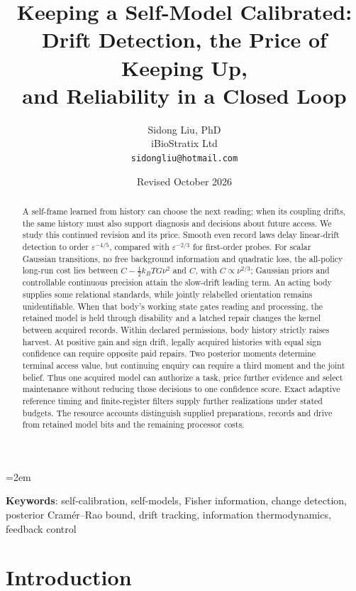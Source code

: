 \documentclass[12pt]{article}
\title{Keeping a Self-Model Calibrated:\\
Drift Detection, the Price of Keeping Up,\\
and Reliability in a Closed Loop}
\author{Sidong Liu, PhD \\
\small iBioStratix Ltd \\
\small \texttt{sidongliu@hotmail.com}}
\date{Revised October 2026}
\theoremstyle{definition}
\begin{document}
\emergencystretch=2em
\raggedbottom
\maketitle

\begin{abstract}
A self-frame learned from history can choose the next reading; when
its coupling drifts, the same history must also support diagnosis
and decisions about future access. We study this continued
revision and its price. Smooth even record laws delay linear-drift
detection to order $\varepsilon^{-4/5}$, compared with
$\varepsilon^{-2/3}$ for first-order probes.
For scalar Gaussian transitions, no free background information and
quadratic loss, the all-policy long-run cost lies between
$C-\tfrac12k_BTG\nu^2$ and $C$, with $C\propto\nu^{2/3}$;
Gaussian priors and controllable continuous precision attain the
slow-drift leading term. An acting body supplies some relational
standards, while jointly relabelled orientation remains unidentifiable.
When that body's working state gates reading and processing, the
retained model is held through disability and a latched repair
changes the kernel between acquired records.
Within declared permissions, body history strictly raises harvest.
At positive gain and sign drift, legally acquired histories with equal
sign confidence can require opposite paid repairs.
Two posterior moments determine terminal access value, but continuing
enquiry can require a third moment and the joint belief.
Thus one acquired model can authorize a task, price further evidence
and select maintenance without reducing those decisions to one
confidence score.
Exact adaptive reference timing and finite-register filters supply
further realizations under stated budgets.
The resource accounts distinguish supplied preparations, records and
drive from retained model bits and the remaining processor costs.
\end{abstract}

\medskip
\noindent\textbf{Keywords}: self-calibration, self-models, Fisher information, change detection, posterior Cram\'er--Rao bound, drift tracking, information thermodynamics, feedback control

\section{Introduction}
\label{sec:intro}
\end{document}
